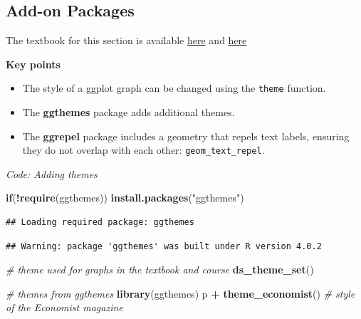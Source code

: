 \documentclass[
]{article}
\newenvironment{Shaded}{\begin{snugshade}}{\end{snugshade}}
\newcommand{\CommentTok}[1]{\textcolor[rgb]{0.56,0.35,0.01}{\textit{#1}}}
\newcommand{\ControlFlowTok}[1]{\textcolor[rgb]{0.13,0.29,0.53}{\textbf{#1}}}
\newcommand{\KeywordTok}[1]{\textcolor[rgb]{0.13,0.29,0.53}{\textbf{#1}}}
\newcommand{\NormalTok}[1]{#1}
\newcommand{\OperatorTok}[1]{\textcolor[rgb]{0.81,0.36,0.00}{\textbf{#1}}}
\newcommand{\StringTok}[1]{\textcolor[rgb]{0.31,0.60,0.02}{#1}}
\providecommand{\tightlist}{%
  \setlength{\itemsep}{0pt}\setlength{\parskip}{0pt}}
\begin{document}
\hypertarget{add-on-packages}{%
\subsection{Add-on Packages}\label{add-on-packages}}

The textbook for this section is available
\href{https://rafalab.github.io/dsbook/ggplot2.html\#add-on-packages}{here}
and
\href{https://rafalab.github.io/dsbook/ggplot2.html\#putting-it-all-together}{here}

\textbf{Key points}

\begin{itemize}
\tightlist
\item
  The style of a ggplot graph can be changed using the \texttt{theme}
  function.
\item
  The \textbf{ggthemes} package adds additional themes.
\item
  The \textbf{ggrepel} package includes a geometry that repels text
  labels, ensuring they do not overlap with each other:
  \texttt{geom\_text\_repel}.
\end{itemize}

\emph{Code: Adding themes}

\begin{Shaded}
\begin{Highlighting}[]
\ControlFlowTok{if}\NormalTok{(}\OperatorTok{!}\KeywordTok{require}\NormalTok{(ggthemes)) }\KeywordTok{install.packages}\NormalTok{(}\StringTok{"ggthemes"}\NormalTok{)}
\end{Highlighting}
\end{Shaded}

\begin{verbatim}
## Loading required package: ggthemes
\end{verbatim}

\begin{verbatim}
## Warning: package 'ggthemes' was built under R version 4.0.2
\end{verbatim}

\begin{Shaded}
\begin{Highlighting}[]
\CommentTok{# theme used for graphs in the textbook and course}
\KeywordTok{ds_theme_set}\NormalTok{()}

\CommentTok{# themes from ggthemes}
\KeywordTok{library}\NormalTok{(ggthemes)}
\NormalTok{p }\OperatorTok{+}\StringTok{ }\KeywordTok{theme_economist}\NormalTok{()    }\CommentTok{# style of the Economist magazine}
\end{Highlighting}
\end{Shaded}
\end{document}
